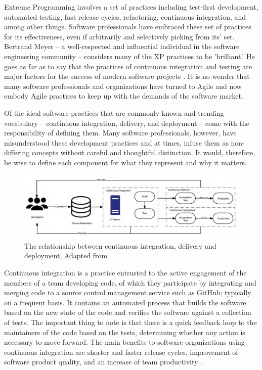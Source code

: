 \documentclass[12pt,a4paper]{article}
\begin{document}
Extreme Programming involves a set of practices including test-first development, automated testing, fast release cycles, refactoring, continuous integration, and among other things. Software professionals have embraced these set of practices for its effectiveness, even if arbitrarily and selectively picking from its' set. Bertrand Meyer -- a well-respected and influential individual in the software engineering community -- considers many of the XP practices to be 'brilliant.' He goes as far as to say that the practices of continuous integration and testing are major factors for the success of modern software projects \cite[p. ~154]{meyer_2014}. It is no wonder that many software professionals and organizations have turned to Agile and now embody Agile practices to keep up with the demands of the software market.

Of the ideal software practices that are commonly known and trending vocabulary -- continuous integration, delivery, and deployment -- come with the responsibility of defining them. Many software professionals, however, have misunderstood these development practices and at times, infuse them as non-differing concepts without careful and thoughtful distinction. It would, therefore, be wise to define each component for what they represent and why it matters.

\begin{figure}[ht!]
    \includegraphics[width=1.02\textwidth]{images/ci_cde_cd.png}
    \captionsetup{justification=centering, labelfont=bf}
    \caption{The relationship between continuous integration, delivery and deployment, Adapted from \protect{}}
    \label{ci_cde_cd}
\end{figure}

Continuous integration is a practice entrusted to the active engagement of the members of a team developing code, of which they participate by integrating and merging code to a source control management service such as GitHub; typically on a frequent basis. It contains an automated process that builds the software based on the new state of the code and verifies the software against a collection of tests. The important thing to note is that there is a quick feedback loop to the maintainers of the code based on the tests, determining whether any action is necessary to move forward. The main benefits to software organizations using continuous integration are shorter and faster release cycles, improvement of software product quality, and an increase of team productivity \cite[p. ~3910]{shahin_babar_zhu_2017}.
\end{document}
